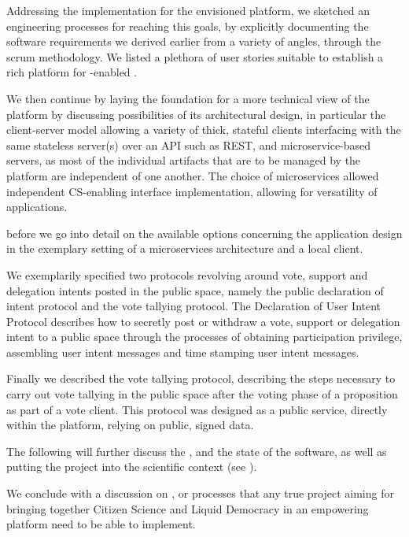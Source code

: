 Addressing the implementation for the envisioned platform, we sketched an engineering processes for reaching this goals, by explicitly documenting the software requirements we derived earlier from a variety of angles, through the scrum methodology.
We listed a plethora of user stories suitable to establish a rich platform for -enabled .

We then continue by laying the foundation for a more technical view of the
platform by discussing possibilities of its architectural design, in particular the client-server model allowing a variety of thick, stateful clients interfacing with the same stateless server(s) over an API such as REST, and microservice-based servers, as most of the individual artifacts that are to be managed by the platform are independent of one another.
The choice of microservices allowed independent CS-enabling interface implementation, allowing for versatility of  applications. 


before we go into detail on the available
options concerning the application design in the exemplary setting of a microservices architecture
and a local client. 

We exemplarily specified two protocols revolving around vote, support
and delegation intents posted in the public space, namely the public declaration of intent protocol and the vote tallying protocol. 
The Declaration of User Intent Protocol describes how to secretly post or withdraw a vote, support or delegation intent to a public space through the processes of obtaining participation privilege, assembling user intent messages and time stamping user intent messages.

Finally we described the vote tallying protocol, describing the steps necessary to carry out vote tallying in the public
space after the voting phase of a proposition as part of a vote client. This protocol was designed as a public service, directly within the platform, relying on public, signed data.

The following will further discuss the , and the state of the software, as well as putting the project into the scientific context (see ).

We conclude with a discussion on , or processes that any true project aiming for bringing together Citizen Science and Liquid Democracy in an empowering platform need to be able to implement.

